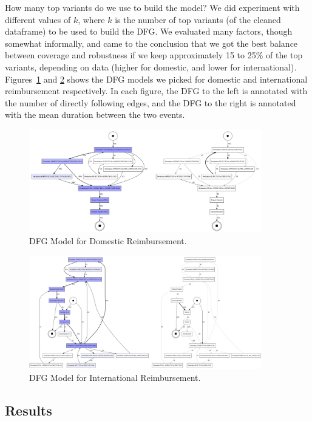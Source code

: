 \documentclass[conference]{IEEEtran}
\begin{document}
How many top variants do we use to build the model?
We did experiment with different values of $k$, where $k$ is the number of
top variants (of the cleaned dataframe) to be used to build the DFG. We
evaluated many factors, though somewhat informally, and came to the conclusion
that we got the best balance between coverage and robustness if
we keep approximately 15 to 25\% of the top variants, depending on data
(higher for domestic, and lower for international). Figures~\ref{fig-domestic}
and \ref{fig-international} shows the DFG models we picked for
domestic and international reimbursement respectively. In each figure,
the DFG to the left is annotated with the number of directly following
edges, and the DFG to the right is annotated with the mean duration between
the two events.

\begin{figure}[htbp]
\centerline{\includegraphics[width=0.90\textwidth]{images/domestic.png}}
\caption{DFG Model for Domestic Reimbursement.}
\label{fig-domestic}
\end{figure}

\begin{figure}[htbp]
\centerline{\includegraphics[width=0.90\textwidth]{images/international.png}}
\caption{DFG Model for International Reimbursement.}
\label{fig-international}
\end{figure}


\subsection{Results}
\end{document}
